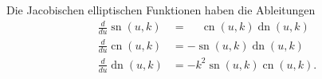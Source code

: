 \begin{satz}
\label{buch:elliptisch:satz:ableitungen}
Die Jacobischen elliptischen Funktionen haben die Ableitungen
\begin{equation}
\begin{aligned}
\frac{d}{du}\operatorname{sn}(u,k)
&=
\phantom{-}\operatorname{cn}(u,k)\operatorname{dn}(u,k)
\\
\frac{d}{du}\operatorname{cn}(u,k)
&=
-\operatorname{sn}(u,k)\operatorname{dn}(u,k)
\\
\frac{d}{du}\operatorname{dn}(u,k)
&=
-k^2\operatorname{sn}(u,k)\operatorname{cn}(u,k).
\end{aligned}
\label{buch:elliptisch:eqn:ableitungsregeln}
\end{equation}
\end{satz}

%
%
